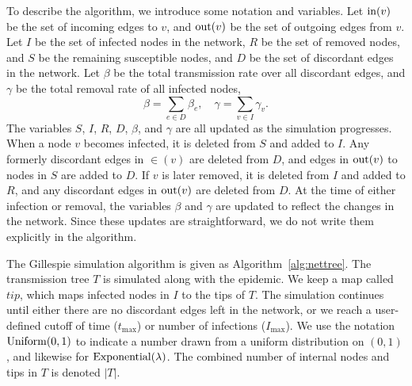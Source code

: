 To describe the algorithm, we introduce some notation and variables. Let
$\operatorname{in}(v)$ be the set of incoming edges to $v$, and $\operatorname{out}(v)$ be the set of
outgoing edges from $v$. Let $I$ be the set of infected nodes in the network,
$R$ be the set of removed nodes, and $S$ be the remaining susceptible nodes,
and $D$ be the set of discordant edges in the network. Let $\beta$ be the total
transmission rate over all discordant edges, and $\gamma$ be the total removal
rate of all infected nodes,
\[
  \beta = \sum_{e \in D} \beta_e, \quad
  \gamma = \sum_{v \in I} \gamma_v.
\]
The variables $S$, $I$, $R$, $D$, $\beta$, and $\gamma$ are all updated as the
simulation progresses. When a node $v$ becomes infected, it is deleted from $S$
and added to $I$. Any formerly discordant edges in $\in(v)$ are deleted from
$D$, and edges in $\operatorname{out}(v)$ to nodes in $S$ are added to $D$. If $v$ is later
removed, it is deleted from $I$ and added to $R$, and any discordant edges in
$\operatorname{out}(v)$ are deleted from $D$. At the time of either infection or removal, the
variables $\beta$ and $\gamma$ are updated to reflect the changes in the
network. Since these updates are straightforward, we do not write them
explicitly in the algorithm.

\newcommand{\tip}{\mathit{tip}}

The Gillespie simulation algorithm is given as Algorithm~\ref{alg:nettree}. The
transmission tree $T$ is simulated along with the epidemic. We keep a map
called $\tip$, which maps infected nodes in $I$ to the tips of $T$. The
simulation continues until either there are no discordant edges left in the
network, or we reach a user-defined cutoff of time ($t_{\max}$) or number of
infections ($I_{\max}$). We use the notation $\operatorname{Uniform}(0, 1)$ to indicate a
number drawn from a uniform distribution on $(0, 1)$, and likewise for
$\operatorname{Exponential}(\lambda)$. The combined number of internal nodes and tips in $T$
is denoted $|T|$.

